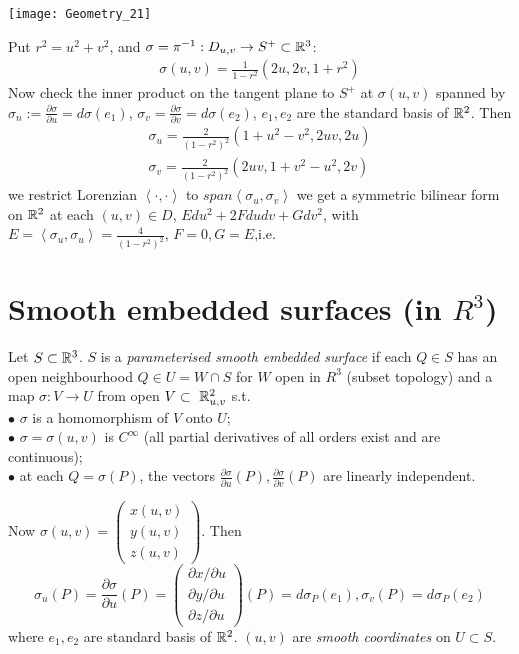 \documentclass[a4paper]{article}
\begin{document}
\texttt{[image: Geometry\_21]}

Put $r^2 = u^2+v^2$, and $\sigma=\pi^{-1}: D_{u,v} \to S^+ \subset \mathbb{R}^3$:
\begin{equation*}
\begin{aligned}
\sigma(u,v) = \frac{1}{1-r^2} (2u,2v,1+r^2)
\end{aligned}
\end{equation*}
Now check the inner product on the tangent plane to $S^+$ at $\sigma(u,v)$ spanned by $\sigma_n:= \frac{\partial \sigma}{\partial u} = d\sigma(e_1)$, $\sigma_v = \frac{\partial \sigma}{\partial v} = d\sigma (e_2)$, $e_1,e_2$ are the standard basis of $\mathbb{R}^2$. Then
\begin{equation*}
\begin{aligned}
\sigma_u = \frac{2}{(1-r^2)^2} (1+u^2-v^2,2uv,2u)\\
\sigma_v = \frac{2}{(1-r^2)^2} (2uv,1+v^2-u^2,2v)
\end{aligned}
\end{equation*}
we restrict Lorenzian $\left<\cdot,\cdot\right>$ to $span\left<\sigma_u,\sigma_v\right>$ we get a symmetric bilinear form on $\mathbb{R}^2$ at each $(u,v) \in D$, $E du^2+2Fdudv + Gdv^2$, with
$E=\left<\sigma_u,\sigma_u\right> = \frac{4}{(1-r^2)^2}$, $F=0,G=E$,i.e.

\newpage

\section{Smooth embedded surfaces (in $R^3$)}

\begin{defi}
Let $S \subset \mathbb{R}^3$. $S$ is a \emph{parameterised smooth embedded surface} if each $Q \in S$ has an open neighbourhood $Q \in U = W \cap S$ for $W$ open in $R^3$ (subset topology) and a map $\sigma: V \to U$ from open $V \subset\ \mathbb{R}^2_{u,v}$ s.t.\\
$\bullet$ $\sigma$ is a homomorphism of $V$ onto $U$;\\
$\bullet$ $\sigma = \sigma(u,v)$ is $C^\infty$ (all partial derivatives of all orders exist and are continuous);\\
$\bullet$ at each $Q = \sigma(P)$, the vectors $\frac{\partial \sigma}{\partial u}(P), \frac{\partial \sigma}{\partial v}(P)$ are linearly independent.
\end{defi}

Now $\sigma(u,v) = \left(\begin{matrix}
x(u,v)\\
y(u,v)\\
z(u,v)
\end{matrix}\right)$. Then $$\sigma_u(P) = \frac{\partial \sigma}{\partial u}(P) = \left(\begin{matrix}
\partial x / \partial u\\
\partial y / \partial u\\
\partial z / \partial u
\end{matrix}\right)(P) = d\sigma_P(e_1), \sigma_v(P) = d\sigma_P(e_2)$$
where $e_1,e_2$ are standard basis of $\mathbb{R}^2$. $(u,v)$ are \emph{smooth coordinates} on $U \subset S$.
\end{document}
